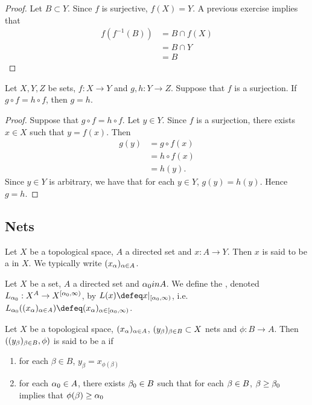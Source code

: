 \documentclass{book}
\begin{document}
	\begin{proof}
		Let $B \subset Y$. Since $f$ is surjective, $f(X) = Y$. A previous exercise implies that 
		\begin{align*}
			f(f^{-1}(B))
			& = B \cap f(X) \\
			& = B \cap Y \\
			& = B
		\end{align*}
	\end{proof}

	\begin{ex} 
		Let $X, Y, Z$ be sets, $f:X \rightarrow Y$ and $g,h:Y \rightarrow Z$. Suppose that $f$ is a surjection. If $g \circ f = h \circ f$, then $g = h$.
	\end{ex}

	\begin{proof}
		Suppose that $g \circ f = h \circ f$. Let $y \in Y$. Since $f$ is a surjection, there exists $x \in X$ such that $y = f(x)$. Then 
		\begin{align*}
			g(y)
			& = g \circ f(x) \\
			& = h \circ f(x) \\
			& = h(y).
		\end{align*}
		Since $y \in Y$ is arbitrary, we have that for each $y \in Y$, $g(y) = h(y)$. Hence $g = h$.
	\end{proof}



	\subsection{Nets}
	
	\begin{defn} 
		Let $X$ be a topological space, $A$ a directed set and $x:A \rightarrow Y$. Then $x$ is said to be a  in $X$. We typically write $(x_{\alpha})_{\alpha \in A}$. 
	\end{defn}
	
	\begin{defn} 
		Let $X$ be a set, $A$ a directed set and $\alpha_0 in A$. We define the , denoted $L_{\alpha_0}: X^{A} \rightarrow X^{[\alpha_0, \infty)}$, by $L(x) \defeq x|_{[\al_0, \infty)}$, i.e. $L_{\al_0}((x_{\al})_{\al \in A}) \defeq (x_{\al})_{\al \in [\al_0, \infty)}$.
	\end{defn}
	
	\begin{defn} 
		Let $X$ be a topological space, $(x_{\alpha})_{\alpha \in A}$, $(y_{\beta})_{\beta \in B} \subset X$ nets and $\phi:B \rightarrow A$. 
		Then $((y_{\beta})_{\beta \in B}, \phi)$ is said to be a  if 
		\begin{enumerate}
			\item for each $\beta \in B$, $y_{\beta} = x_{\phi(\beta)}$
			\item for each $\alpha_0 \in A$, there exists $\beta_0 \in B$ such that for each $\beta \in B$, $\beta \geq \beta_0$ implies that $\phi(\beta) \geq \alpha_0$
		\end{enumerate}
	\end{defn}
	
\end{document}
